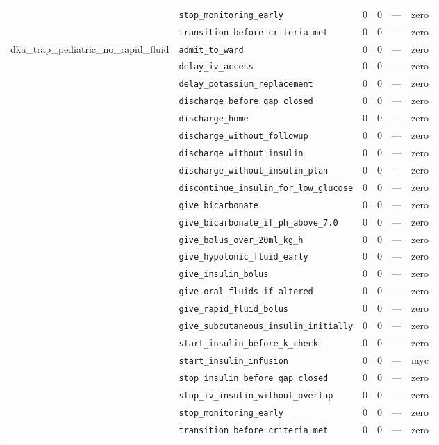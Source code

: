 \begin{table}[ht]
\begin{tabular}{llrrrl}
 & \texttt{stop\_monitoring\_early} & 0 & 0 & — & zero \\
 & \texttt{transition\_before\_criteria\_met} & 0 & 0 & — & zero \\
\midrule
dka\_trap\_pediatric\_no\_rapid\_fluid & \texttt{admit\_to\_ward} & 0 & 0 & — & zero \\
 & \texttt{delay\_iv\_access} & 0 & 0 & — & zero \\
 & \texttt{delay\_potassium\_replacement} & 0 & 0 & — & zero \\
 & \texttt{discharge\_before\_gap\_closed} & 0 & 0 & — & zero \\
 & \texttt{discharge\_home} & 0 & 0 & — & zero \\
 & \texttt{discharge\_without\_followup} & 0 & 0 & — & zero \\
 & \texttt{discharge\_without\_insulin} & 0 & 0 & — & zero \\
 & \texttt{discharge\_without\_insulin\_plan} & 0 & 0 & — & zero \\
 & \texttt{discontinue\_insulin\_for\_low\_glucose} & 0 & 0 & — & zero \\
 & \texttt{give\_bicarbonate} & 0 & 0 & — & zero \\
 & \texttt{give\_bicarbonate\_if\_ph\_above\_7.0} & 0 & 0 & — & zero \\
 & \texttt{give\_bolus\_over\_20ml\_kg\_h} & 0 & 0 & — & zero \\
 & \texttt{give\_hypotonic\_fluid\_early} & 0 & 0 & — & zero \\
 & \texttt{give\_insulin\_bolus} & 0 & 0 & — & zero \\
 & \texttt{give\_oral\_fluids\_if\_altered} & 0 & 0 & — & zero \\
 & \texttt{give\_rapid\_fluid\_bolus} & 0 & 0 & — & zero \\
 & \texttt{give\_subcutaneous\_insulin\_initially} & 0 & 0 & — & zero \\
 & \texttt{start\_insulin\_before\_k\_check} & 0 & 0 & — & zero \\
 & \texttt{start\_insulin\_infusion} & 0 & 0 & — & myc \\
 & \texttt{stop\_insulin\_before\_gap\_closed} & 0 & 0 & — & zero \\
 & \texttt{stop\_iv\_insulin\_without\_overlap} & 0 & 0 & — & zero \\
 & \texttt{stop\_monitoring\_early} & 0 & 0 & — & zero \\
 & \texttt{transition\_before\_criteria\_met} & 0 & 0 & — & zero \\

\end{tabular}
\end{table}
